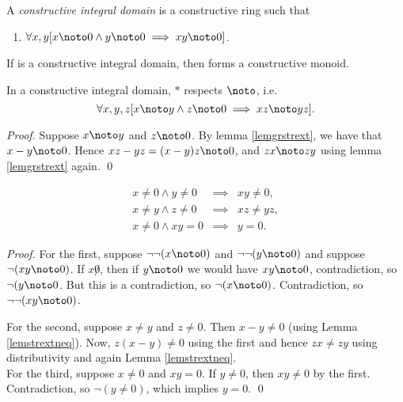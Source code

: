 \begin{definition}\label{defintdom}
  A {\em constructive integral domain\/} is a constructive ring
   such that
\begin{enumerate}
  \item $\forall x,y [x\noto 0 \wedge y\noto 0 \implies x y \noto 0]$.
\end{enumerate}
\end{definition}

\begin{lemma}\label{nonzsetoid}
If  is a constructive integral domain,
then  forms a
constructive monoid.
\end{lemma}

\begin{lemma}\label{intmulrespap}
In a constructive integral domain, $*$ respects $\noto$, i.e.
\[
\forall x,y,z[x\noto y \wedge z\noto 0 \implies x z \noto y z].
\]
\end{lemma}
\begin{proof}
  Suppose $x\noto y$ and $z\noto 0$. By lemma \ref{lemgrstrext}, we
  have that $x-y \noto 0$.  Hence $x z-y z=(x-y)z\noto 0$, and 
  $z x\noto z y$ using lemma \ref{lemgrstrext} again. \qed
\end{proof}


\begin{lemma}\label{lempropid}
\begin{eqnarray*}
x\neq 0 \wedge y\neq 0 &\implies& x y \neq 0,\\
x\neq y \wedge z\neq 0 &\implies& x z \neq y  z,\\
x\neq0 \wedge x y = 0 &\implies & y=0.
\end{eqnarray*}
\end{lemma}

\begin{proof}
For the first, suppose $\neg\neg(x\noto 0)$ and $\neg\neg(y\noto 0)$
and suppose $\neg(x y\noto 0)$. If $x\not 0$, then if $y\noto 0$ we
would have $x y \noto 0$, contradiction, so $\neg(y\noto 0$. But this
is a contradiction, so $\neg(x\noto 0)$. Contradiction, so 
$\neg\neg(x y\noto 0)$.

For the second, suppose $x\neq y$ and $z\neq 0$. Then $x-y \neq 0$
(using Lemma \ref{lemstrextneq}). Now, $z (x-y) \neq 0$ using the
first and hence $z x \neq z y$ using distributivity and again Lemma
\ref{lemstrextneq}.\\ For the third, suppose $x\neq 0$ and $x y=0$. If
$y\neq 0$, then $x y \neq 0$ by the first. Contradiction, so
$\neg(y\neq 0)$, which implies $y=0$. \qed
\end{proof}

